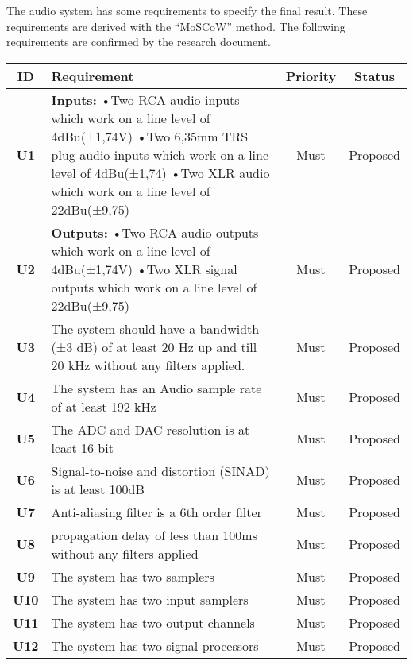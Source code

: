 The audio system has some requirements to specify the final result. 
These requirements are derived with the “MoSCoW” method. 
The following requirements are confirmed by the research document.

\begin{longtable}{|c|p{10cm}|c|c|}
	\hline
	\textbf{ID} & \textbf{Requirement} & \textbf{Priority} & \textbf{Status}\\ \hline 
	\textbf{U1} & \textbf{Inputs:} \newline
	•Two RCA audio inputs which work on a line level of 4dBu(±1,74V)\newline
	•Two 6,35mm TRS plug audio inputs which work on a line level of 4dBu(±1,74)\newline
	•Two XLR audio which work on a line level of 22dBu(±9,75) 																	& Must	 & Proposed\\ \hline
	\textbf{U2} & \textbf{Outputs:} \newline
	•Two RCA audio outputs which work on a line level of 4dBu(±1,74V)\newline
	•Two XLR signal outputs which work on a line level of 22dBu(±9,75)
	 & Must & Proposed\\ \hline
	\textbf{U3} &The system should have a bandwidth (±3 dB) of at least 20 Hz up and till 20 kHz without any filters applied. 	& Must   & Proposed\\ \hline
	\textbf{U4} &The system has an Audio sample rate of at least 192 kHz 														& Must   & Proposed\\ \hline
	\textbf{U5} &The ADC and DAC resolution is at least 16-bit 																	& Must   & Proposed\\ \hline
	\textbf{U6} &Signal-to-noise and distortion (SINAD) is at least 100dB  														& Must   & Proposed\\ \hline
	\textbf{U7} &Anti-aliasing filter is a 6th order filter										 								& Must   & Proposed\\ \hline
	\textbf{U8} &propagation delay of less than 100ms without any filters applied												& Must   & Proposed\\ \hline
	\textbf{U9} &The system has two samplers											 										& Must   & Proposed\\ \hline
	\textbf{U10} &The system has two input samplers 																				& Must   & Proposed\\ \hline
	\textbf{U11}&The system has two output channels														 						& Must   & Proposed\\ \hline
	\textbf{U12}&The system has two signal processors														 					& Must   & Proposed\\ \hline

\end{longtable}
